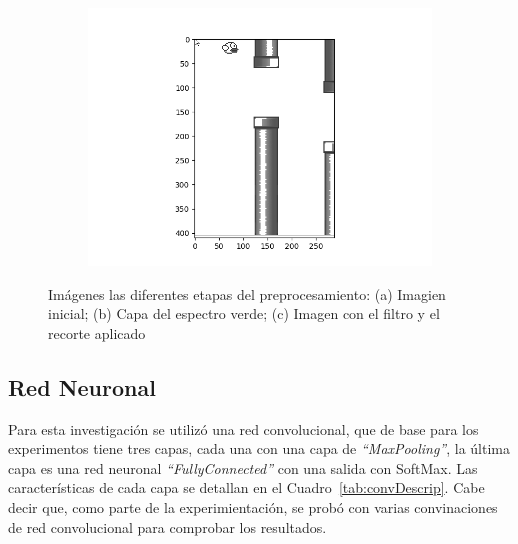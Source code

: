 \documentclass[journal]{IEEEtran}
\begin{document}
\begin{figure}[h]
\begin{subfigure}[b]{0.5\textwidth}
            \includegraphics[width=\textwidth]{images/pre3.png}
            \caption{}
        \end{subfigure}
        \caption{Imágenes las diferentes etapas del preprocesamiento: (a) Imagien inicial; (b) Capa del espectro verde; (c) Imagen con el filtro y el recorte aplicado \label{fig:animals}}
    \end{figure}

\subsection{Red Neuronal}
Para esta investigación se utilizó una red convolucional, que de base para los experimentos tiene tres capas, cada una con una capa de \emph{``MaxPooling''}, la última capa es una red neuronal \emph{``FullyConnected''} con una salida con SoftMax. Las características de cada capa se detallan en el Cuadro~\ref{tab:convDescrip}. Cabe decir que, como parte de la experimientación, se probó con varias convinaciones de red convolucional para comprobar los resultados.
\end{document}
